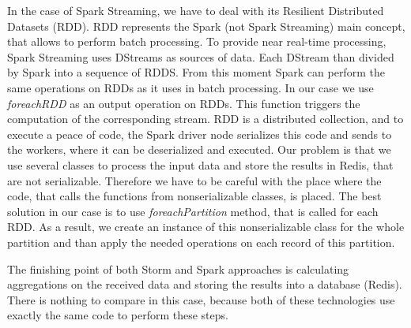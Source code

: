 In the case of Spark Streaming, we have to deal with its Resilient Distributed Datasets (RDD).
RDD represents the Spark (not Spark Streaming) main concept, that allows to perform batch processing.
To provide near real-time processing, Spark Streaming uses DStreams as sources of data.
Each DStream than divided by Spark into a sequence of RDDS.
From this moment Spark can perform the same operations on RDDs as it uses in batch processing.
In our case we use \textit{foreachRDD} as an output operation on RDDs.
This function triggers the computation of the corresponding stream.
RDD is a distributed collection, and to execute a peace of code, the Spark driver node serializes this code and sends to the workers, where it can be deserialized and executed.
Our problem is that we use several classes to process the input data and store the results in Redis, that are not serializable.
Therefore we have to be careful with the place where the code, that calls the functions from nonserializable classes, is placed.
The best solution in our case is to use \textit{foreachPartition} method, that is called for each RDD.
As a result, we create an instance of this nonserializable class for the whole partition and than apply the needed operations on each record of this partition. 
 
The finishing point of both Storm and Spark approaches is calculating aggregations on the received data and storing the results into a database (Redis).
There is nothing to compare in this case, because both of these technologies use exactly the same code to perform these steps.



